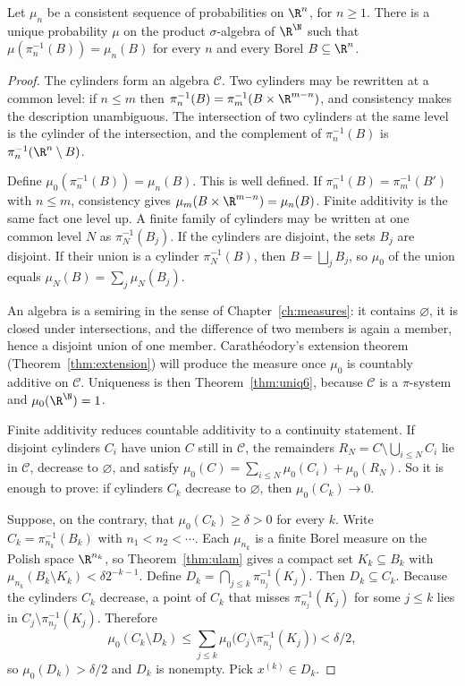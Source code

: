 \begin{theorem}[Kolmogorov, 1933]\label{thm:kolmogorov}
Let $\mu_n$ be a consistent sequence of probabilities on $\R^n$, for $n\ge 1$. There is a unique probability $\mu$ on the product
$\sigma$-algebra of $\R^\N$ such that $\mu(\pi_n^{-1}(B))=\mu_n(B)$ for every $n$ and every Borel $B\subseteq\R^n$.
\end{theorem}
\begin{proof}
The cylinders form an algebra $\mathcal C$. Two cylinders may be rewritten at a common level: if $n\le m$ then
$\pi_n^{-1}(B)=\pi_m^{-1}(B\times\R^{m-n})$, and consistency makes the description unambiguous. The intersection of two cylinders at the same
level is the cylinder of the intersection, and the complement of $\pi_n^{-1}(B)$ is $\pi_n^{-1}(\R^n\setminus B)$.

Define $\mu_0(\pi_n^{-1}(B))=\mu_n(B)$. This is well defined. If $\pi_n^{-1}(B)=\pi_m^{-1}(B')$ with $n\le m$, consistency gives
$\mu_m(B\times\R^{m-n})=\mu_n(B)$. Finite additivity is the same fact one level up. A finite family of cylinders may be written at one common
level $N$ as $\pi_N^{-1}(B_j)$. If the cylinders are disjoint, the sets $B_j$ are disjoint. If their union is a cylinder $\pi_N^{-1}(B)$, then
$B=\bigsqcup_j B_j$, so $\mu_0$ of the union equals $\mu_N(B)=\sum_j\mu_N(B_j)$.

An algebra is a semiring in the sense of Chapter~\ref{ch:measures}: it contains $\varnothing$, it is closed under intersections, and the
difference of two members is again a member, hence a disjoint union of one member. Carath\'eodory's extension theorem
(Theorem~\ref{thm:extension}) will produce the measure once $\mu_0$ is countably additive on $\mathcal C$. Uniqueness is then
Theorem~\ref{thm:uniq6}, because $\mathcal C$ is a $\pi$-system and $\mu_0(\R^\N)=1$.

Finite additivity reduces countable additivity to a continuity statement. If disjoint cylinders $C_i$ have union $C$ still in $\mathcal C$,
the remainders $R_N=C\setminus\bigcup_{i\le N}C_i$ lie in $\mathcal C$, decrease to $\varnothing$, and satisfy
$\mu_0(C)=\sum_{i\le N}\mu_0(C_i)+\mu_0(R_N)$. So it is enough to prove: if cylinders $C_k$ decrease to $\varnothing$, then $\mu_0(C_k)\to 0$.

Suppose, on the contrary, that $\mu_0(C_k)\ge\delta>0$ for every $k$. Write $C_k=\pi_{n_k}^{-1}(B_k)$ with $n_1<n_2<\cdots$. Each $\mu_{n_k}$
is a finite Borel measure on the Polish space $\R^{n_k}$, so Theorem~\ref{thm:ulam} gives a compact set $K_k\subseteq B_k$ with
$\mu_{n_k}(B_k\setminus K_k)<\delta 2^{-k-1}$. Define $D_k=\bigcap_{j\le k}\pi_{n_j}^{-1}(K_j)$. Then $D_k\subseteq C_k$. Because the cylinders
$C_k$ decrease, a point of $C_k$ that misses $\pi_{n_j}^{-1}(K_j)$ for some $j\le k$ lies in $C_j\setminus\pi_{n_j}^{-1}(K_j)$. Therefore
\[\mu_0(C_k\setminus D_k)\le\sum_{j\le k}\mu_0\bigl(C_j\setminus\pi_{n_j}^{-1}(K_j)\bigr)<\delta/2,\]
so $\mu_0(D_k)>\delta/2$ and $D_k$ is nonempty. Pick $x^{(k)}\in D_k$.


\end{proof}

